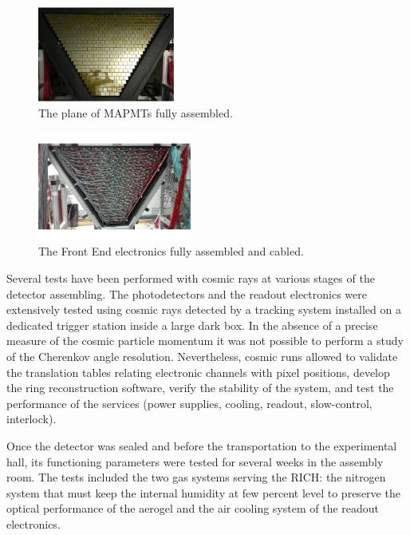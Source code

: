 \documentclass[final,5p,times,twocolumn]{elsarticle}
\begin{document}
\begin{figure}
\begin{center}
\includegraphics[width=0.4\textwidth]{EPS/mapmt.pdf}
\caption{ The plane of MAPMTs fully assembled. }
\label{fig:mapmts}
\end{center}
\end{figure}

\begin{figure}
\begin{center}
\includegraphics[width=0.45\textwidth]{EPS/electronics.pdf}
\caption{ The Front End electronics fully assembled and cabled.  }
\label{fig:electronics}
\end{center}
\end{figure}

Several tests have been performed with cosmic rays at various stages of the detector assembling. 
The photodetectors and the readout electronics were extensively tested using cosmic rays detected by a tracking system installed on
a dedicated trigger station inside a large dark box. In the absence of a precise
measure of the cosmic particle momentum it was not possible to perform a study of the Cherenkov angle resolution.
Nevertheless, cosmic runs allowed to validate the translation tables relating electronic channels with pixel positions,
develop the ring reconstruction software, verify the stability of the system, and test the performance of the services
(power supplies, cooling, readout, slow-control, interlock).

Once the detector was sealed and before the transportation to the experimental hall, its functioning parameters were tested for several
weeks in the assembly room. The tests included the two gas systems serving the RICH: the nitrogen system that must keep the internal
humidity at few percent level to preserve the optical performance of the aerogel and the air cooling system of the readout electronics.
\end{document}
